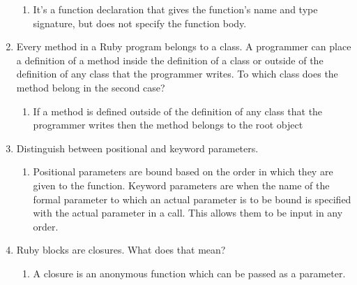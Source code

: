 \begin{enumerate}
\begin{answer}
    \begin{enumerate}
    \item It's a function declaration that gives the function's name and type signature,
 but does not specify the function body. 
    \end{enumerate}

    \end{answer}
  
  \item Every method in a Ruby program belongs to a class.
    A programmer can place a definition of a method inside
    the definition of a class or outside of the definition
    of any class that the programmer writes. To which class
    does the method belong in the second case?

  
    \begin{answer}

    \begin{enumerate}
    \item If a method is defined outside of the definition of any class that the
 programmer writes then the method belongs to the root object
    \end{enumerate}

    \end{answer}
  \item Distinguish between positional and keyword parameters.

    \begin{answer}

    \begin{enumerate}
    \item Positional parameters are bound based on the order in which they are
 given to the function. Keyword parameters are when the name of the formal
 parameter to which an actual parameter is to be bound is specified with the 
actual parameter in a call. This allows them to be input in any order.
    \end{enumerate}

    \end{answer}
  \item Ruby blocks are closures. What does that mean?

  
    \begin{answer}

    \begin{enumerate}
    \item A closure is an anonymous function which can be passed as a parameter.  
    \end{enumerate}


\end{answer}
\end{enumerate}
